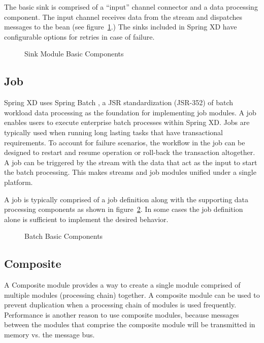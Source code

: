 \par

The basic sink is comprised of a ``input'' channel connector and a data processing
component. The input channel receives data from the stream and dispatches
messages to the bean (see figure~\ref{fig:sinkmbc}.) The sinks
included in Spring XD have configurable options for retries in case of failure.

\par

\begin{figure}
\centering
{}
\caption{Sink Module Basic Components}
\label{fig:sinkmbc}
\end{figure}

\par

\subsection{Job}
Spring XD uses Spring Batch \cite{spring-batch-reference}, a JSR standardization (JSR-352)
of batch workload data processing as the foundation for implementing
job modules. A job enables users to execute enterprise batch processes within Spring XD.
Jobs are typically used when running long lasting tasks that have transactional requirements.
To account for failure scenarios, the workflow in the job can be designed to restart and 
resume operation or roll-back the transaction altogether. A job can be triggered by the
stream with the data that act as the input to start the batch processing. This makes
streams and job modules unified under a single platform.

\par

A job is typically comprised of a job definition along with the supporting
data processing components as shown in figure~\ref{fig:batchmbc}.
In some cases the job definition alone is sufficient to implement the desired behavior.

\par

\begin{figure}
\centering
{}
\caption{Batch Basic Components}
\label{fig:batchmbc}
\end{figure}

\par 

\subsection{Composite}
A Composite module provides a way to create a single module comprised of
multiple modules (processing chain) together.  A composite module can be used to prevent
duplication when a processing chain of modules is used frequently.
Performance is another reason to use composite modules, because messages between the 
modules that comprise the composite module will be transmitted in memory vs. the message 
bus.  

